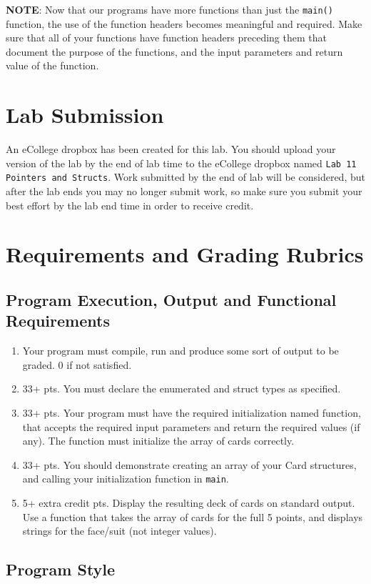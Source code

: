 \documentclass[11pt]{article}
\begin{document}
\textbf{NOTE}: Now that our programs have more functions than just the
\verb~main()~ function, the use of the function headers becomes meaningful
and required.  Make sure that all of your functions have function
headers preceding them that document the purpose of the functions, and
the input parameters and return value of the function.
\section*{Lab Submission}
\label{sec-4}


An eCollege dropbox has been created for this lab.  You should upload
your version of the lab by the end of lab time to the eCollege dropbox
named \verb~Lab 11 Pointers and Structs~.  Work submitted by the end of
lab will be considered, but after the lab ends you may no longer
submit work, so make sure you submit your best effort by the lab end
time in order to receive credit.
\section*{Requirements and Grading Rubrics}
\label{sec-5}
\subsection*{Program Execution, Output and Functional Requirements}
\label{sec-5-1}


\begin{enumerate}
\item Your program must compile, run and produce some sort of output to be
  graded. 0 if not satisfied.
\item 33+ pts.  You must declare the enumerated and struct types as
   specified.
\item 33+ pts.  Your program must have the required initialization named
   function, that accepts the required input parameters and return the
   required values (if any).  The function must initialize the
   array of cards correctly.
\item 33+ pts. You should demonstrate creating an array of your Card
   structures, and calling your initialization function in \verb~main~.
\item 5+ extra credit pts.  Display the resulting deck of cards on
   standard output.  Use a function that takes the array of cards
   for the full 5 points, and displays strings for the face/suit
   (not integer values).
\end{enumerate}
\subsection*{Program Style}
\label{sec-5-2}
\end{document}
